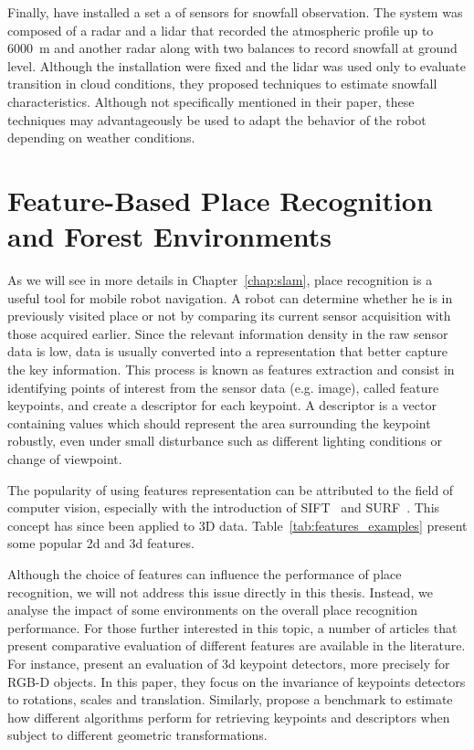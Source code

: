 Finally, \citet{servomaa2002snowfall} have installed a set a of sensors for snowfall observation. The system was composed of a radar and a \gls*{lidar} that recorded the atmospheric profile up to \SI{6000}{\meter} and another radar along with two balances to record snowfall at ground level. Although the installation were fixed and the \gls*{lidar} was used only to evaluate transition in cloud conditions, they proposed techniques to estimate snowfall characteristics. Although not specifically mentioned in their paper, these techniques may advantageously be used to adapt the behavior of the robot depending on weather conditions.  



\section{Feature-Based Place Recognition and Forest Environments}
\label{sec:literature_slam}

As we will see in more details in Chapter~\ref{chap:slam}, place recognition is a useful tool for mobile robot navigation. A robot can determine whether he is in previously visited place or not by comparing its current sensor acquisition with those acquired earlier. Since the relevant information density in the raw sensor data is low, data is usually converted into a representation that better capture the key information. This process is known as features extraction and consist in identifying points of interest from the sensor data (e.g. image), called feature keypoints, and create a descriptor for each keypoint. A descriptor is a vector containing values which should represent the area surrounding the keypoint robustly, even under small disturbance such as different lighting conditions or change of viewpoint.

The popularity of using features representation can be attributed to the field of computer vision, especially with the introduction of SIFT~\citep{Lowe2004} and SURF~\citep{Bay2006}. This concept has since been applied to 3D data. Table~\ref{tab:features_examples} present some popular \gls*{2d} and \gls*{3d} features. 

Although the choice of features can influence the performance of place recognition, we will not address this issue directly in this thesis. Instead, we analyse the impact of some environments on the overall place recognition performance. For those further interested in this topic, a number of articles that present comparative evaluation of different features are available in the literature. For instance, \citet{Filipe2014} present an evaluation of \gls*{3d} keypoint detectors, more precisely for RGB-D objects. In this paper, they focus on the invariance of keypoints detectors to rotations, scales and translation. Similarly, \citet{Boyer2011} propose a benchmark to estimate how different algorithms perform for retrieving keypoints and descriptors when subject to different geometric transformations.

